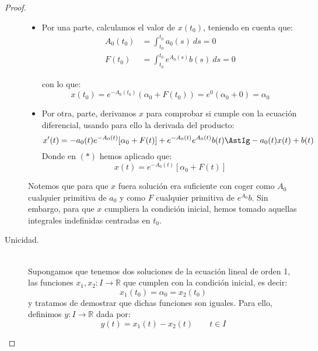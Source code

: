 \begin{prop}
\begin{proof}
\begin{description}
                \begin{itemize}
                    \item Por una parte, calculamos el valor de $x(t_0)$, teniendo en cuenta que:
                        \begin{align*}
                            A_0(t_0) &= \int_{t_0}^{t_0} a_0(s)~ds  = 0 \\
                            F(t_0) &= \int_{t_0}^{t_0} e^{A_0(s)}b(s)~ds = 0
                        \end{align*}

                        con lo que:
                        \begin{equation*}
                            x(t_0) = e^{-A_0(t_0)}(\alpha_0 + F(t_0)) = e^0 (\alpha_0 + 0) = \alpha_0
                        \end{equation*}
                    \item Por otra, parte, derivamos $x$ para comprobar si cumple con la ecuación diferencial, usando para ello la derivada del producto:
                        \begin{equation*}
                            x'(t) = -a_0(t)e^{-A_0(t)} [\alpha_0 + F(t)] + e^{-A_0(t)}e^{A_0(t)}b(t) \AstIg -a_0(t) x(t) + b(t)
                        \end{equation*}
                        Donde en $(\ast)$ hemos aplicado que:
                        \begin{equation*}
                            x(t) = e^{-A_0(t)} [\alpha_0 + F(t)]
                        \end{equation*}
                \end{itemize}
                Notemos que para que $x$ fuera solución era suficiente con coger como $A_0$ cualquier primitiva de $a_0$ y como $F$ cualquier primitiva de $e^{A_0}b$. Sin embargo, para que $x$ cumpliera la condición inicial, hemos tomado aquellas integrales indefinidas centradas en $t_0$.

            \item [Unicidad.]~\\
                Supongamos que tenemos dos soluciones de la ecuación lineal de orden 1, las funciones $x_1,x_2:I\rightarrow\mathbb{R}$ que cumplen con la condición inicial, es decir:
                \begin{equation*}
                    x_1(t_0) = \alpha_0 = x_2(t_0)
                \end{equation*}
                y tratamos de demostrar que dichas funciones son iguales. Para ello, definimos $y:I\rightarrow\mathbb{R}$ dada por:
                \begin{equation*}
                    y(t) = x_1(t) - x_2(t) \qquad t\in I
                \end{equation*}


\end{description}
\end{proof}
\end{prop}
